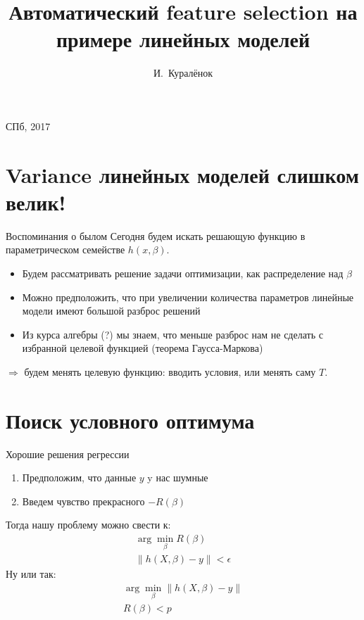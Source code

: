 \documentclass[14pt, fleqn, xcolor={dvipsnames, table}]{beamer}
\title{Автоматический feature selection на примере линейных моделей\\\small{}}
\author[]{\small{%
И.~Куралёнок}}
\date{}
\begin{document}
\begin{frame}
\maketitle
\small
\begin{center}
\vspace{-60pt}
\vspace{80pt}
\footnotesize СПб, 2017
\end{center}
\end{frame}



\section{Variance линейных моделей слишком велик!}

\begin{frame}{Воспоминания о былом}
Сегодня будем искать решающую функцию в параметрическом семействе $h(x, \beta)$.
\begin{itemize}
  \item Будем рассматривать решение задачи оптимизации, как распределение над $\beta$
  \item Можно предположить, что при увеличении количества параметров линейные модели имеют большой разброс решений
  \item Из курса алгебры (?) мы знаем, что меньше разброс нам не сделать с избранной целевой функцией (теорема Гаусса-Маркова)
\end{itemize}
$\Rightarrow$ будем менять целевую функцию: вводить условия, или менять саму $T$.
\end{frame}

\section{Поиск условного оптимума}
\begin{frame}{Хорошие решения регрессии}
\begin{enumerate}
  \item Предположим, что данные $y$ y нас шумные
  \item Введем чувство прекрасного $-R(\beta)$ 
\end{enumerate}
Тогда нашу проблему можно свести к:
$$\begin{array}{l}
\arg \min_\beta R(\beta) \\
\| h(X,\beta) - y\| < \epsilon
\end{array}$$
Ну или так:
$$\begin{array}{l}
\arg \min_\beta \| h(X,\beta) - y\| \\
R(\beta) < p
\end{array}$$
\end{frame}
\end{document}
